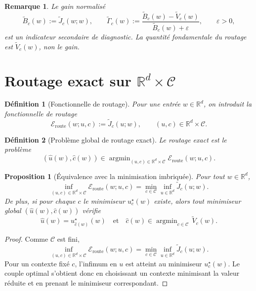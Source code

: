 \documentclass[11pt,a4paper]{article}
\newtheorem{definition}{Définition}[section]
\newtheorem{proposition}{Proposition}[section]
\newtheorem{remark}{Remarque}[section]
\DeclareMathOperator{\argmin}{argmin}
\newcommand{\R}{\mathbb R}
\newcommand{\Ccal}{\mathcal C}
\begin{document}
\begin{remark}
Le gain normalisé
\[
\widetilde B_c(w):=\widetilde J_c(w;w),
\qquad
\widetilde\Gamma_c(w):=\frac{\widetilde B_c(w)-\widetilde V_c(w)}{\widetilde B_c(w)+\varepsilon},
\qquad \varepsilon>0,
\]
est un indicateur secondaire de diagnostic. La quantité fondamentale du routage est \(\widetilde V_c(w)\), non le gain.
\end{remark}

\section{Routage exact sur \(\R^d\times\Ccal\)}

\begin{definition}[Fonctionnelle de routage]
Pour une entrée \(w\in\R^d\), on introduit la fonctionnelle de routage
\[
\mathcal E_{\mathrm{route}}(w;u,c):=\widetilde J_c(u;w),
\qquad
(u,c)\in \R^d\times\Ccal.
\]
\end{definition}

\begin{definition}[Problème global de routage exact]
Le routage exact est le problème
\[
(\hat u(w),\hat c(w))
\in
\argmin_{(u,c)\in \R^d\times\Ccal}\mathcal E_{\mathrm{route}}(w;u,c).
\]
\end{definition}

\begin{proposition}[Équivalence avec la minimisation imbriquée]
Pour tout \(w\in\R^d\),
\[
\inf_{(u,c)\in \R^d\times\Ccal}\mathcal E_{\mathrm{route}}(w;u,c)
=
\min_{c\in\Ccal}\inf_{u\in\R^d}\widetilde J_c(u;w).
\]
De plus, si pour chaque \(c\) le minimiseur \(u_c^\star(w)\) existe, alors tout minimiseur global \((\hat u(w),\hat c(w))\) vérifie
\[
\hat u(w)=u_{\hat c(w)}^\star(w)
\quad\text{et}\quad
\hat c(w)\in\argmin_{c\in\Ccal}\,\widetilde V_c(w).
\]
\end{proposition}

\begin{proof}
Comme \(\Ccal\) est fini,
\[
\inf_{(u,c)\in \R^d\times\Ccal}\mathcal E_{\mathrm{route}}(w;u,c)
=
\min_{c\in\Ccal}\inf_{u\in\R^d}\widetilde J_c(u;w).
\]
Pour un contexte fixé \(c\), l'infimum en \(u\) est atteint au minimiseur \(u_c^\star(w)\). Le couple optimal s'obtient donc en choisissant un contexte minimisant la valeur réduite et en prenant le minimiseur correspondant.
\end{proof}
\end{document}
